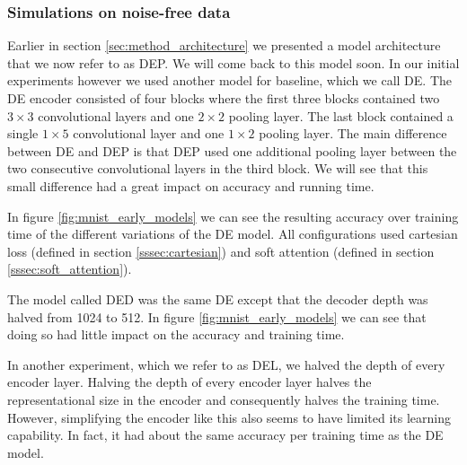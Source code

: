 
\subsubsection{Simulations on noise-free data}

Earlier in section \ref{sec:method_architecture} we presented a model architecture that we now refer to as DEP. We will come back to this model soon. In our initial experiments however we used another model for baseline, which we call DE. The DE encoder consisted of four blocks where the first three blocks contained two $3 \times 3$ convolutional layers and one $2 \times 2$ pooling layer. The last block contained a single $1 \times 5$ convolutional layer and one $1 \times 2$ pooling layer.
The main difference between DE and DEP is that DEP used one additional pooling layer between the two consecutive convolutional layers in the third block.
We will see that this small difference had a great impact on accuracy and running time.



In figure \ref{fig:mnist_early_models} we can see the resulting accuracy over training time of the different variations of the DE model.
All configurations used cartesian loss (defined in section \ref{sssec:cartesian}) and soft attention (defined in section \ref{sssec:soft_attention}).



The model called DED was the same DE except that the decoder depth was halved from 1024 to 512. In figure \ref{fig:mnist_early_models} we can see that doing so had little impact on the accuracy and training time.

In another experiment, which we refer to as DEL, we halved the depth of every encoder layer. Halving the depth of every encoder layer halves the representational size in the encoder and consequently halves the training time. However, simplifying the encoder like this also seems to have limited its learning capability. In fact, it had about the same accuracy per training time as the DE model.

